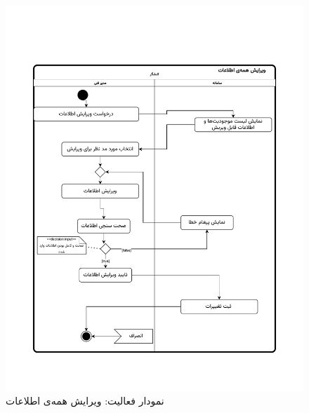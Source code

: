 \begin{figure}[ht!]
	\centering
	\includegraphics[scale=0.8, page=1]{figs/OOD-activity-editall.pdf}
	\caption{نمودار فعالیت: ویرایش همه‌ی اطلاعات}
\end{figure}
\FloatBarrier
\newpage